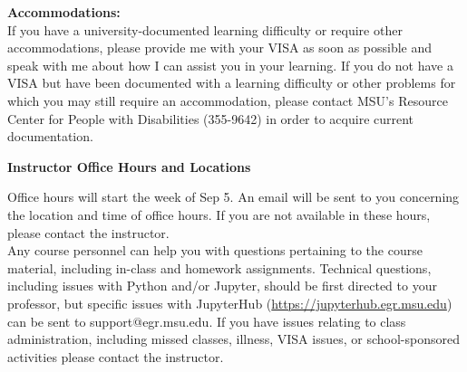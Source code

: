 \documentclass[oneside,letterpaper,11pt]{exam}
\begin{document}
{\noindent \textbf{Accommodations:}}\\[-5pt]

{\noindent If you have a university-documented learning difficulty or require other accommodations, please provide me with your VISA as soon as possible and speak with me about how I can assist you in your learning. If you do not have a VISA but have been documented with a learning difficulty or other problems for which you may still require an accommodation, please contact MSU's Resource Center for People with Disabilities (355-9642) in order to acquire current documentation.}


\begin{center}
	\vspace{5pt}
	\textbf{Instructor Office Hours and Locations}
	\vspace{5pt}
\end{center}

{\noindent Office hours will start the week of Sep 5. An email will be sent to you concerning the location and time of office hours. If you are not available in these hours, please contact the instructor.}\\[-5pt]



{\noindent Any course personnel can help you with questions pertaining to the course material, including in-class and homework assignments. Technical questions, including issues with Python and/or Jupyter, should be first directed to your professor, but specific issues with JupyterHub (\url{https://jupyterhub.egr.msu.edu}) can be sent to support@egr.msu.edu. If you have issues relating to class administration, including missed classes, illness, VISA issues, or school-sponsored activities please contact the instructor.}
\end{document}
